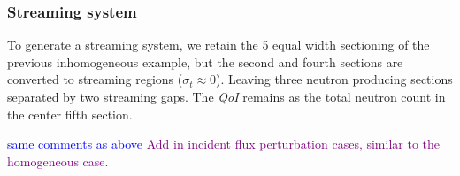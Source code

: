 \documentclass[12pt]{report}
\newcommand{\sigt}{\sigma_t}
\newcommand{\qoi}{{\it QoI}\xspace}
\newcommand{\comment}[2]{\marginpar{\textcolor{#2}{$\star$}}\textcolor{#2}{#1}\newline}
\newcommand{\jcr}[1]{\comment{#1}{blue}}
\newcommand{\todo}[1]{\comment{#1}{purple}}
\newcommand{\jcr}[1]{\phantom{a}}
\newcommand{\todo}[1]{\phantom{a}}
\begin{document}
\subsubsection{Streaming system}
To generate a streaming system, we retain the 5 equal width sectioning of the previous inhomogeneous example, but the second and fourth sections are converted to streaming regions ($\sigt \approx 0 $). Leaving three neutron producing sections separated by two streaming gaps. The \qoi remains as the total neutron count in the center fifth section.

\jcr{same comments as above}
\todo{Add in incident flux perturbation cases, similar to the homogeneous case.}
\end{document}
